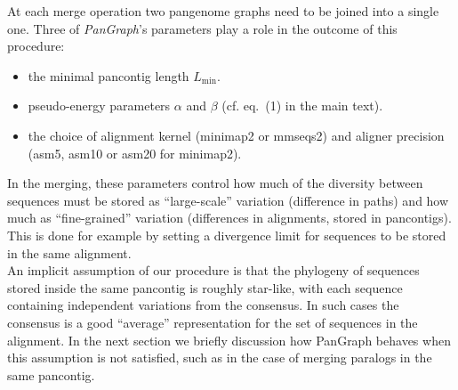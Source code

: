 \documentclass[aps,rmp,reprint,superscriptaddress,notitlepage,10pt,onecolumn]{revtex4-1}
\newcommand{\Lthr}{L_{\min}}
\begin{document}
At each merge operation two pangenome graphs need to be joined into a single one. Three of \textit{PanGraph}'s parameters play a role in the outcome of this procedure:
\begin{itemize}
    \item the minimal pancontig length $\Lthr$.
    \item pseudo-energy parameters $\alpha$ and $\beta$ (cf. eq.~(1) in the main text).
    \item the choice of alignment kernel (minimap2 or mmseqs2) and aligner precision (asm5, asm10 or asm20 for minimap2).
\end{itemize}
In the merging, these parameters control how much of the diversity between sequences must be stored as ``large-scale'' variation (difference in paths) and how much as ``fine-grained'' variation (differences in alignments, stored in pancontigs). This is done for example by setting a divergence limit for sequences to be stored in the same alignment.\\
An implicit assumption of our procedure is that the phylogeny of sequences stored inside the same pancontig is roughly star-like, with each sequence containing independent variations from the consensus. In such cases the consensus is a good ``average'' representation for the set of sequences in the alignment.
In the next section we briefly discussion how PanGraph behaves when this assumption is not satisfied, such as in the case of merging paralogs in the same pancontig.\\
\end{document}
